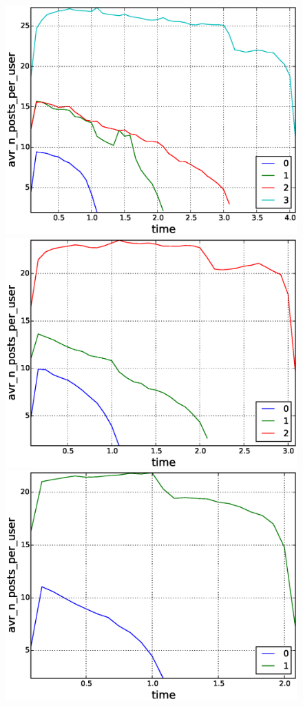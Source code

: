 \begin{figure}[!tb]
\includegraphics[scale=0.2]{./images/avr_posts_per_user_for_surviving_year_for_2011.eps}
\includegraphics[scale=0.2]{./images/avr_posts_per_user_for_surviving_year_for_2012.eps}
\includegraphics[scale=0.2]{./images/avr_posts_per_user_for_surviving_year_for_2013.eps}

\end{figure}
